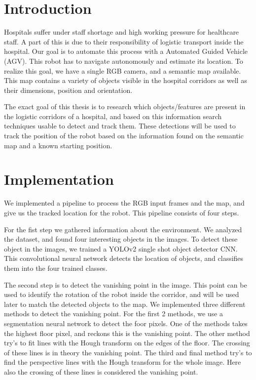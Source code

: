 \section*{Introduction}
Hospitals suffer under staff shortage and high working pressure for healthcare staff.
A part of this is due to their responsibility of logistic transport inside the hospital.
Our goal is to automate this process with a Automated Guided Vehicle (AGV).
This robot has to navigate autonomously and estimate its location.
To realize this goal, we have a single RGB camera, and a semantic map available.
This map contains a variety of objects visible in the hospital corridors as well as their dimensions, position and orientation.

The exact goal of this thesis is to research which objects/features are present in the logistic corridors of a hospital, and based on this
information search techniques usable to detect and track them.
These detections will be used to track the position of the robot based on the information found on the semantic map and a known starting position.


\section*{Implementation}
We implemented a pipeline to process the RGB input frames and the map, and give us the tracked location for the robot.
This pipeline consists of four steps.

For the fist step we gathered information about the environment.
We analyzed the dataset, and found four interesting objects in the images.
To detect these object in the images, we trained a YOLOv2 single shot object detector CNN.
This convolutional neural network detects the location of objects, and classifies them into the four trained classes.

The second step is to detect the vanishing point in the image.
This point can be used to identify the rotation of the robot inside the corridor, and will be used later to match the detected objects to the map.
We implemented three different methods to detect the vanishing point.
For the first 2 methods, we use a segmentation neural network to detect the foor pixels.
One of the methods takes the highest floor pixel, and reckons this is the vanishing point.
The other method try's to fit lines with the Hough transform on the edges of the floor.
The crossing of these lines is in theory the vanishing point.
The third and final method try's to find the perspective lines with the Hough transform for the whole image.
Here also the crossing of these lines is considered the vanishing point.

